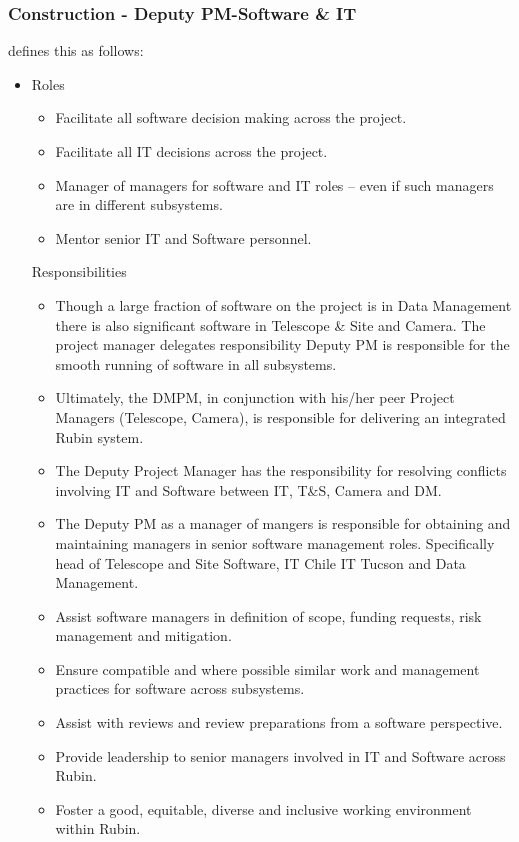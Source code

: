 \subsubsection{Construction - Deputy PM-Software \& IT} \label{sec:seputypm}
 defines this as follows:

\begin{itemize}
\item Roles
\begin{itemize}
\item Facilitate all software decision making across the project.
\item Facilitate all IT decisions across the project.
\item Manager of managers for software and IT roles – even if such managers are in different
subsystems.
\item Mentor senior IT and Software personnel.
\end{itemize}
Responsibilities
\begin{itemize}
\item Though a large fraction of software on the project is in Data Management there is also
significant software in Telescope \& Site and Camera. The project manager delegates
responsibility Deputy PM is responsible for the smooth running of software in all
subsystems.
\item Ultimately, the DMPM, in conjunction with his/her peer Project Managers (Telescope,
Camera), is responsible for delivering an integrated Rubin system.
\item The Deputy Project Manager has the responsibility for resolving conflicts involving IT
and Software between IT, T\&S, Camera and DM.
\item The Deputy PM as a manager of mangers is responsible for obtaining and maintaining
managers in senior software management roles. Specifically head of Telescope and
Site Software, IT Chile IT Tucson and Data Management.
\item Assist software managers in definition of scope, funding requests, risk management
and mitigation.
\item Ensure compatible and where possible similar work and management practices for
software across subsystems.
\item Assist with reviews and review preparations from a software perspective.
\item Provide leadership to senior managers involved in IT and Software across Rubin.
\item Foster a good, equitable, diverse and inclusive working environment within Rubin.

\end{itemize}
\end{itemize}
